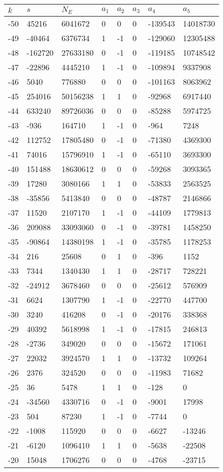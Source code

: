 \documentclass{amsart}
\begin{document}
\begin{longtable}{|l|l|l|lllll|}
\hline
$k$ & $s$ & $N_E$ & $a_1$ & $a_2$ & $a_3$ & $a_4$ & $a_5$\\
\hline
-50&45216&6041672&0&0&0&-139543&14018730\\
-49&-40464&6376734&1&-1&0&-129060&12305488\\
-48&-162720&27633180&0&-1&0&-119185&10748542\\
-47&-22896&4445210&1&-1&0&-109894&9337908\\
-46&5040&776880&0&0&0&-101163&8063962\\
-45&254016&50156238&1&1&0&-92968&6917440\\
-44&633240&89726036&0&0&0&-85288&5974725\\
-43&-936&164710&1&-1&0&-964&7248\\
-42&112752&17805480&0&-1&0&-71380&4369300\\
-41&74016&15796910&1&-1&0&-65110&3693300\\
-40&151488&18630612&0&0&0&-59268&3093365\\
-39&17280&3080166&1&1&0&-53833&2563525\\
-38&-35856&5413840&0&0&0&-48787&2146866\\
-37&11520&2107170&1&-1&0&-44109&1779813\\
-36&209088&33093060&0&-1&0&-39781&1458250\\
-35&-90864&14380198&1&-1&0&-35785&1178253\\
-34&216&25608&0&1&0&-396&1152\\
-33&7344&1340430&1&1&0&-28717&728221\\
-32&-24912&3678460&0&0&0&-25612&576909\\
-31&6624&1307790&1&-1&0&-22770&447700\\
-30&3240&416208&0&-1&0&-20176&338368\\
-29&40392&5618998&1&-1&0&-17815&246813\\
-28&-2736&349020&0&0&0&-15672&171061\\
-27&22032&3924570&1&1&0&-13732&109264\\
-26&2376&324520&0&0&0&-11983&71682\\
-25&36&5478&1&1&0&-128&0\\
-24&-34560&4330716&0&-1&0&-9001&17998\\
-23&504&87230&1&-1&0&-7744&0\\
-22&-1008&115920&0&0&0&-6627&-13246\\
-21&-6120&1096410&1&1&0&-5638&-22508\\
-20&15048&1706276&0&0&0&-4768&-23715\\

\end{longtable}
\end{document}
